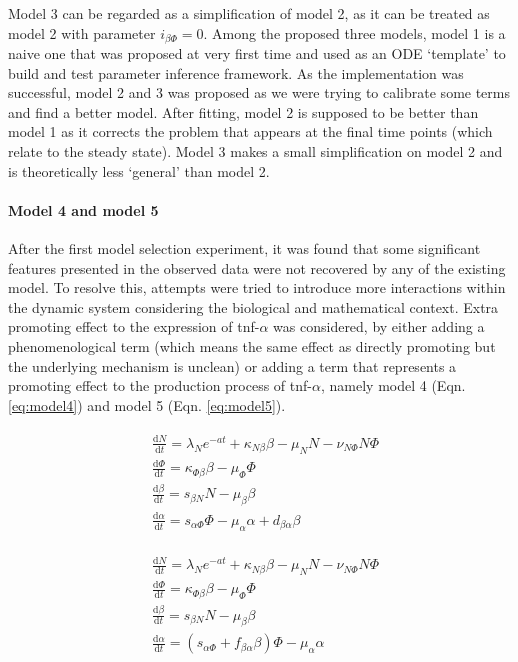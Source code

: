 \documentclass[12pt,a4paper]{report}
\begin{document}
Model 3 can be regarded as a simplification of model 2, as it can be treated as model 2 with parameter $i_{\beta\Phi}=0$. Among the proposed three models, model 1 is a naive one that was proposed at very first time and used as an ODE `template' to build and test parameter inference framework. As the implementation was successful, model 2 and 3 was proposed as we were trying to calibrate some terms and find a better model. After fitting, model 2 is supposed to be better than model 1 as it corrects the problem that appears at the final time points (which relate to the steady state). Model 3 makes a small simplification on model 2 and is theoretically less `general' than model 2.

\paragraph{Model 4 and model 5}

After the first model selection experiment, it was found that some significant features presented in the observed data were not recovered by any of the existing model. To resolve this, attempts were tried to introduce more interactions within the dynamic system considering the biological and  mathematical context. Extra promoting effect to the expression of tnf-$\alpha$ was considered, by either adding a phenomenological term (which means the same effect as directly promoting but the underlying mechanism is unclean) or adding a term that represents a promoting effect to the production process of tnf-$\alpha$, namely model 4 (Eqn. \ref{eq:model4}) and model 5 (Eqn. \ref{eq:model5}).

\begin{align}
    \label{eq:model4}
    \begin{split}
        &\frac{\mathrm{d} N}{\mathrm{d} t}=\lambda_Ne^{-at}+\kappa_{N\beta}\beta-\mu_NN-\nu_{N\Phi}N\Phi\\
        &\frac{\mathrm{d} \Phi}{\mathrm{d} t}=\kappa_{\Phi\beta}\beta-\mu_\Phi\Phi\\
        &\frac{\mathrm{d} \beta}{\mathrm{d} t}=s_{\beta N}N-\mu_\beta\beta\\
        &\frac{\mathrm{d} \alpha}{\mathrm{d} t}=s_{\alpha\Phi}\Phi-\mu_\alpha\alpha+d_{\beta\alpha}\beta
    \end{split}
\end{align}

\begin{align}
    \label{eq:model5}
    \begin{split}
        &\frac{\mathrm{d} N}{\mathrm{d} t}=\lambda_Ne^{-at}+\kappa_{N\beta}\beta-\mu_NN-\nu_{N\Phi}N\Phi\\
        &\frac{\mathrm{d} \Phi}{\mathrm{d} t}=\kappa_{\Phi\beta}\beta-\mu_\Phi\Phi\\
        &\frac{\mathrm{d} \beta}{\mathrm{d} t}=s_{\beta N}N-\mu_\beta\beta\\
        &\frac{\mathrm{d} \alpha}{\mathrm{d} t}=(s_{\alpha\Phi}+f_{\beta\alpha}\beta)\Phi-\mu_\alpha\alpha
    \end{split}
\end{align}
\end{document}
